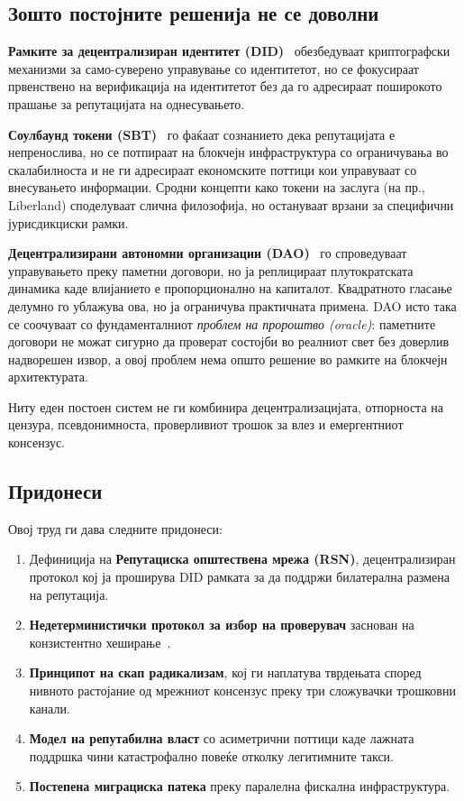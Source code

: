 \documentclass[11pt,a4paper,twocolumn]{article}
\begin{document}
\subsection{Зошто постојните решенија не се доволни}

\textbf{Рамките за децентрализиран идентитет (DID)}~\cite{did2022} обезбедуваат криптографски механизми за само-суверено управување со идентитетот, но се фокусираат првенствено на верификација на идентитетот без да го адресираат поширокото прашање за репутацијата на однесувањето.

\textbf{Соулбаунд токени (SBT)}~\cite{weyl2022} го фаќаат сознанието дека репутацијата е непренослива, но се потпираат на блокчејн инфраструктура со ограничувања во скалабилноста и не ги адресираат економските поттици кои управуваат со внесувањето информации. Сродни концепти како токени на заслуга (на пр., Liberland) споделуваат слична филозофија, но остануваат врзани за специфични јурисдикциски рамки.

\textbf{Децентрализирани автономни организации (DAO)}~\cite{buterin2014} го спроведуваат управувањето преку паметни договори, но ја реплицираат плутократската динамика каде влијанието е пропорционално на капиталот. Квадратното гласање~\cite{buterin2019} делумно го ублажува ова, но ја ограничува практичната примена. DAO исто така се соочуваат со фундаменталниот \emph{проблем на пророштво (oracle)}: паметните договори не можат сигурно да проверат состојби во реалниот свет без доверлив надворешен извор, а овој проблем нема општо решение во рамките на блокчејн архитектурата.

Ниту еден постоен систем не ги комбинира децентрализацијата, отпорноста на цензура, псевдонимноста, проверливиот трошок за влез и емергентниот консензус.

\subsection{Придонеси}

Овој труд ги дава следните придонеси:
\begin{enumerate}[nosep]
\item Дефиниција на \textbf{Репутациска општествена мрежа (RSN)}, децентрализиран протокол кој ја проширува DID рамката за да поддржи билатерална размена на репутација.
\item \textbf{Недетерминистички протокол за избор на проверувач} заснован на конзистентно хеширање~\cite{karger1997}.
\item \textbf{Принципот на скап радикализам}, кој ги наплатува тврдењата според нивното растојание од мрежниот консензус преку три сложувачки трошковни канали.
\item \textbf{Модел на репутабилна власт} со асиметрични поттици каде лажната поддршка чини катастрофално повеќе отколку легитимните такси.
\item \textbf{Постепена миграциска патека} преку паралелна фискална инфраструктура.
\end{enumerate}
\end{document}
